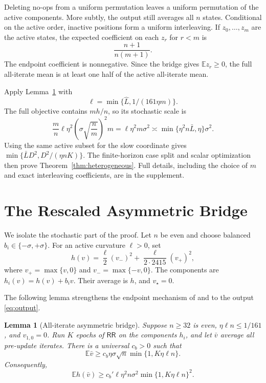 \documentclass[twoside]{article}
\newtheorem{lemma}[theorem]{Lemma}
\newcommand{\E}{\mathbb E}
\newcommand{\RR}{\mathsf{RR}}
\begin{document}
Deleting no-ops from a uniform permutation leaves a uniform permutation of
the active components. More subtly, the output still averages all $n$ states.
Conditional on the active order, inactive positions form a uniform
interleaving. If $z_0,\ldots,z_m$ are the active states, the expected
coefficient on each $z_r$ for $r<m$ is
\[
 \frac{n+1}{n(m+1)}.
\]
The endpoint coefficient is nonnegative. Since the bridge gives
$\E z_r\ge0$, the full all-iterate mean is at least one half of the active
all-iterate mean.

Apply Lemma~\ref{lem:bridge} with
\[
 \ell=\min\{\widehat L,1/(161\eta m)\}.
\]
The full objective contains $m h/n$, so its stochastic scale is
\[
 \frac mn\ell\eta^2
 \left(\sigma\sqrt{\frac nm}\right)^2m
 =\ell\eta^2m\sigma^2
 \asymp\min\{\eta^2n\bar L,\eta\}\sigma^2.
\]
Using the same active subset for the slow coordinate gives
$\min\{\bar LD^2,D^2/(\eta nK)\}$. The finite-horizon case split and scalar
optimization then prove Theorem~\ref{thm:heterogeneous}. Full details,
including the choice of $m$ and exact interleaving coefficients, are in the
supplement.

\section{The Rescaled Asymmetric Bridge}
\label{sec:bridge}

We isolate the stochastic part of the proof. Let $n$ be even and choose
balanced $b_i\in\{-\sigma,+\sigma\}$. For an active curvature $\ell>0$, set
\begin{equation}
 h(v)=\frac{\ell}{2}(v_-)^2
 +\frac{\ell}{2\cdot2415}(v_+)^2,
 \label{eq:h}
\end{equation}
where $v_+=\max\{v,0\}$ and $v_-=\max\{-v,0\}$. The components are
$h_i(v)=h(v)+b_iv$. Their average is $h$, and $v_\star=0$.

The following lemma strengthens the endpoint mechanism of
\citet{rajput2020closing} and \citet{cha2023tighter} to the output
\eqref{eq:output}.

\begin{lemma}[All-iterate asymmetric bridge]
\label{lem:bridge}
Suppose $n\ge32$ is even, $\eta\ell n\le1/161$, and $v_{1,0}=0$.
Run $K$ epochs of $\RR$ on the components $h_i$, and let $\bar v$ average all
pre-update iterates. There is a universal $c_b>0$ such that
\begin{equation}
 \E\bar v\ge c_b\eta\sigma\sqrt n
 \min\{1,K\eta\ell n\}.
 \label{eq:bridge-mean}
\end{equation}
Consequently,
\begin{equation}
 \E h(\bar v)\ge c_b'
 \ell\eta^2n\sigma^2
 \min\{1,K\eta\ell n\}^2.
 \label{eq:bridge-risk}
\end{equation}
\end{lemma}
\end{document}
